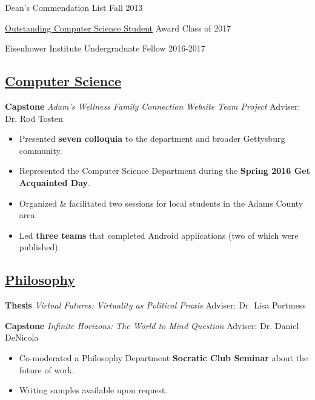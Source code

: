 \documentclass[11pt]{article}
\begin{document}
Dean's Commendation List \hfill Fall 2013

\href{http://www.gettysburg.edu/academics/cs/programs/honors.dot}{Outstanding Computer Science Student} Award \hfill Class of 2017

Eisenhower Institute Undergraduate Fellow 
\hfill
2016-2017

\subsection*{\underline{Computer Science}}

\textbf{Capstone} \textit{Adam's Wellness Family Connection Website Team Project} \hfill Adviser: Dr. Rod Tosten

\begin{itemize}[noitemsep]
\item Presented \textbf{seven colloquia} to the department and broader Gettysburg community.
\item Represented the Computer Science Department during the \textbf{Spring 2016 Get Acquainted Day}. 
\item Organized \& facilitated two  sessions for local students in the Adams County area.
\item Led \textbf{three teams} that completed Android applications (two of which were published).
\end{itemize}

\subsection*{\underline{Philosophy}}
\textbf{Thesis} \textit{Virtual Futures: Virtuality as Political Praxis} \hfill Adviser: Dr. Lisa Portmess

\textbf{Capstone} \textit{Infinite Horizons: The World to Mind Question} \hfill Adviser: Dr. Daniel DeNicola

\begin{itemize}[noitemsep]
\item Co-moderated a Philosophy Department \textbf{Socratic Club Seminar} about the future of work.
\item Writing samples available upon request.
\end{itemize}
\end{document}
